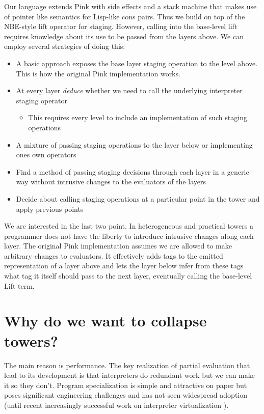 \documentclass{article}
\theoremstyle{definition}
\begin{document}
Our language extends Pink with side effects and a stack machine that makes use of pointer like semantics for Lisp-like cons pairs. Thus we build on top of the NBE-style lift operator for staging. However, calling into
the base-level lift requires knowledge about its use to be passed from the layers above. We can employ several strategies of doing this:
\begin{itemize}
	\item A basic approach exposes the base layer staging operation to the level above. This is how the original Pink implementation works.
	\item At every layer \textit{deduce} whether we need to call the underlying interpreter staging operator
	\begin{itemize}
		\item This requires every level to include an implementation of such staging operations
	\end{itemize}
	\item A mixture of passing staging operations to the layer below or implementing ones own operators
	\item Find a method of passing staging decisions through each layer in a generic way without intrusive changes to the evaluators of the layers
	\item Decide about calling staging operations at a particular point in the tower and apply previous points
\end{itemize}
We are interested in the last two point. In heterogeneous and practical towers a programmer does not have the liberty to introduce intrusive changes along each layer.
The original Pink implementation assumes we are allowed to make arbitrary changes to evaluators. It effectively adds tags to the emitted representation of a layer above and lets the layer below infer from these tags
what tag it itself should pass to the next layer, eventually calling the base-level Lift term.

\section{Why do we want to collapse towers?}
The main reason is performance. The key realization of partial evaluation that lead to its development is that interpreters do redundant work but we can make it so they don't. Program specialization
is simple and attractive on paper but poses significant engineering challenges and has not seen widespread adoption (until recent increasingly successful work on interpreter virtualization \cite{wurthinger2013one}).
\end{document}
